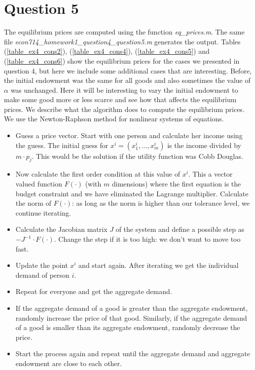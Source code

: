 \documentclass[a4paper,12pt]{article}
\begin{document}
    
    
    
    \medskip
    \medskip
    \section*{Question 5}   
    \medskip
    
    The equilibrium prices are computed using the function \textit{eq\_prices.m}. The same file \textit{econ714\_homework1\_question4\_question5.m} generates the output. Tables (\ref{table_ex4_cons2}), (\ref{table_ex4_cons4}), (\ref{table_ex4_cons5}) and (\ref{table_ex4_cons6}) show the equilibrium prices for the cases we presented in question $4$, but here we include some additional cases that are interesting. Before, the initial endowment was the same for all goods and also sometimes the value of $\alpha$ was unchanged. Here it will be interesting to vary the initial endowment to make some good more or less scarce and see how that affects the equilibrium prices. We describe what the algorithm does to compute the equilibrium prices. We use the Newton-Raphson method for nonlinear systems of equations. 
    
    \begin{itemize}
        \item Guess a price vector. Start with one person and calculate her income using the guess. The initial guess for $x^i=(x^i_1,\dots, x^i_m)$ is the income divided by $m\cdot p_j$. This would be the solution if the utility function was Cobb Douglas. 
        \item Now calculate the first order condition at this value of $x^i$. This a vector valued function $F(\cdot)$ (with $m$ dimensions) where the first equation is the budget constraint and we have eliminated the Lagrange multiplier. Calculate the norm of $F(\cdot)$: as long as the norm is higher than our tolerance level, we continue iterating. 
        \item Calculate the Jacobian matrix $J$ of the system and define a possible step as $-J^{-1}\cdot F(\cdot)$. Change the step if it is too high: we don't want to move too fast. 
        
        \item Update the point $x^i$ and start again. After iterating we get the individual demand of person $i$. 
        
        \item Repeat for everyone and get the aggregate demand. 
        
        \item If the aggregate demand of a good is greater than the aggregate endowment, randomly increase the price of that good. Similarly, if the aggregate demand of a good is smaller than its aggregate endowment, randomly decrease the price. 
        
        \item Start the process again and repeat until the aggregate demand and aggregate endowment are close to each other. 
    \end{itemize}
    
\end{document}
